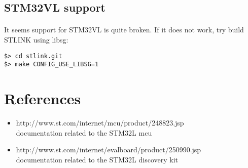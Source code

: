 \documentclass[a4paper, 11pt]{article}
\begin{document}
\subsection{STM32VL support}
\paragraph{}
It seems support for STM32VL is quite broken. If it does not work, try build STLINK using libsg:
\begin{small}
\begin{lstlisting}[frame=tb]
$> cd stlink.git
$> make CONFIG_USE_LIBSG=1
\end{lstlisting}
\end{small}


\newpage
\section{References}
\begin{itemize}
\item http://www.st.com/internet/mcu/product/248823.jsp\\
  documentation related to the STM32L mcu
\item http://www.st.com/internet/evalboard/product/250990.jsp\\
  documentation related to the STM32L discovery kit
\end{itemize}
\end{document}
